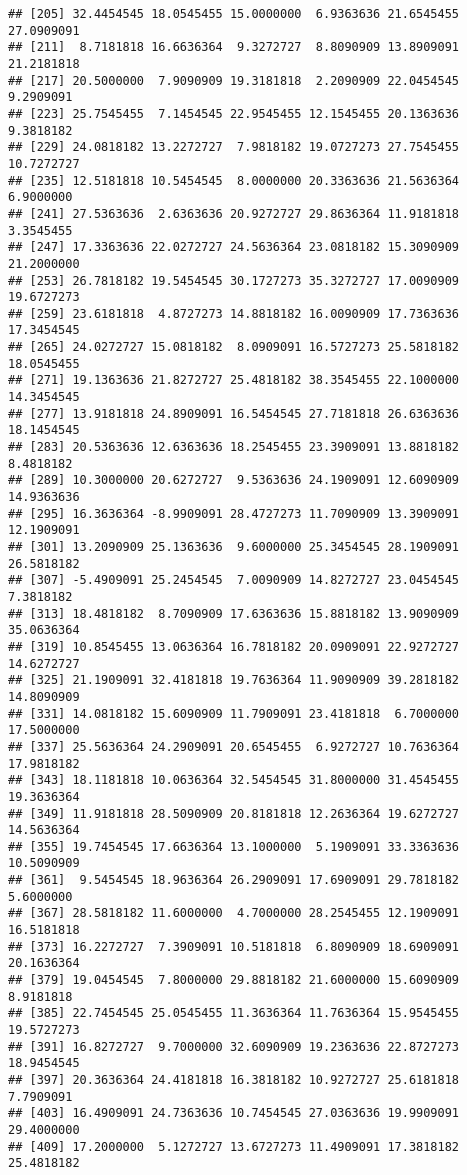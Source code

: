 \documentclass[]{book}
\begin{document}
\begin{verbatim}
## [205] 32.4454545 18.0545455 15.0000000  6.9363636 21.6545455 27.0909091
## [211]  8.7181818 16.6636364  9.3272727  8.8090909 13.8909091 21.2181818
## [217] 20.5000000  7.9090909 19.3181818  2.2090909 22.0454545  9.2909091
## [223] 25.7545455  7.1454545 22.9545455 12.1545455 20.1363636  9.3818182
## [229] 24.0818182 13.2272727  7.9818182 19.0727273 27.7545455 10.7272727
## [235] 12.5181818 10.5454545  8.0000000 20.3363636 21.5636364  6.9000000
## [241] 27.5363636  2.6363636 20.9272727 29.8636364 11.9181818  3.3545455
## [247] 17.3363636 22.0272727 24.5636364 23.0818182 15.3090909 21.2000000
## [253] 26.7818182 19.5454545 30.1727273 35.3272727 17.0090909 19.6727273
## [259] 23.6181818  4.8727273 14.8818182 16.0090909 17.7363636 17.3454545
## [265] 24.0272727 15.0818182  8.0909091 16.5727273 25.5818182 18.0545455
## [271] 19.1363636 21.8272727 25.4818182 38.3545455 22.1000000 14.3454545
## [277] 13.9181818 24.8909091 16.5454545 27.7181818 26.6363636 18.1454545
## [283] 20.5363636 12.6363636 18.2545455 23.3909091 13.8818182  8.4818182
## [289] 10.3000000 20.6272727  9.5363636 24.1909091 12.6090909 14.9363636
## [295] 16.3636364 -8.9909091 28.4727273 11.7090909 13.3909091 12.1909091
## [301] 13.2090909 25.1363636  9.6000000 25.3454545 28.1909091 26.5818182
## [307] -5.4909091 25.2454545  7.0090909 14.8272727 23.0454545  7.3818182
## [313] 18.4818182  8.7090909 17.6363636 15.8818182 13.9090909 35.0636364
## [319] 10.8545455 13.0636364 16.7818182 20.0909091 22.9272727 14.6272727
## [325] 21.1909091 32.4181818 19.7636364 11.9090909 39.2818182 14.8090909
## [331] 14.0818182 15.6090909 11.7909091 23.4181818  6.7000000 17.5000000
## [337] 25.5636364 24.2909091 20.6545455  6.9272727 10.7636364 17.9818182
## [343] 18.1181818 10.0636364 32.5454545 31.8000000 31.4545455 19.3636364
## [349] 11.9181818 28.5090909 20.8181818 12.2636364 19.6272727 14.5636364
## [355] 19.7454545 17.6636364 13.1000000  5.1909091 33.3363636 10.5090909
## [361]  9.5454545 18.9636364 26.2909091 17.6909091 29.7818182  5.6000000
## [367] 28.5818182 11.6000000  4.7000000 28.2545455 12.1909091 16.5181818
## [373] 16.2272727  7.3909091 10.5181818  6.8090909 18.6909091 20.1636364
## [379] 19.0454545  7.8000000 29.8818182 21.6000000 15.6090909  8.9181818
## [385] 22.7454545 25.0545455 11.3636364 11.7636364 15.9545455 19.5727273
## [391] 16.8272727  9.7000000 32.6090909 19.2363636 22.8727273 18.9454545
## [397] 20.3636364 24.4181818 16.3818182 10.9272727 25.6181818  7.7909091
## [403] 16.4909091 24.7363636 10.7454545 27.0363636 19.9909091 29.4000000
## [409] 17.2000000  5.1272727 13.6727273 11.4909091 17.3818182 25.4818182

\end{verbatim}
\end{document}
